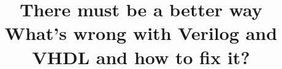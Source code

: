 \documentclass[conference,compsoc]{IEEEtran}
\begin{document}
%
\title{There must be a better way\\What's wrong with Verilog and VHDL and how to fix it?}


\author{
}


%








\maketitle
\end{document}
